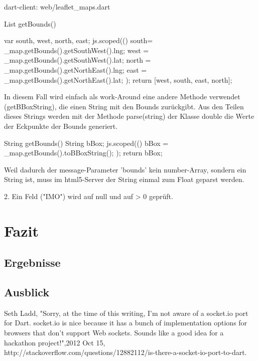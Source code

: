 dart-client: web/leaflet\_maps.dart

  List getBounds(){
    var south, west, north, east;
    js.scoped((){
    south= \_map.getBounds().getSouthWest().lng;
        west = \_map.getBounds().getSouthWest().lat;
        north = \_map.getBounds().getNorthEast().lng;
        east = \_map.getBounds().getNorthEast().lat;
 });
return [west, south, east, north];
    
In diesem Fall wird einfach als work-Around eine andere Methode verwendet (getBBoxString), die einen String mit den Bounds zurückgibt. Aus den Teilen dieses Strings werden mit der Methode parse(string) der Klasse double die Werte der Eckpunkte der Bounds generiert.

String getBounds(){
    String bBox;
    js.scoped((){
      bBox = \_map.getBounds().toBBoxString();
    });
    return bBox;
  }

 Weil dadurch der message-Parameter 'bounds' kein number-Array, sondern ein String ist, muss im html5-Server der String einmal zum Float geparst werden.



2. Ein Feld ("IMO") wird auf null und auf > 0 geprüft.


\chapter{Fazit}\label{c.Fazit}

 \section{Ergebnisse }

\section{Ausblick}



%
\begin{thebibliography}{999}
	 Seth Ladd, "Sorry, at the time of this writing, I'm not aware of a socket.io port for Dart. socket.io is nice because it has a bunch of implementation options for browsers that don't support Web sockets. Sounds like a good idea for a hackathon project!",2012 Oct 15,  http://stackoverflow.com/questions/12882112/is-there-a-socket-io-port-to-dart.
\end{thebibliography}

}
